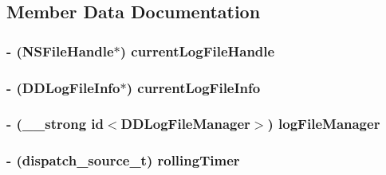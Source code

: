 \subsection{Member Data Documentation}
\hypertarget{interface_d_d_file_logger_a984d7760af0949c892412e1a0693e4d0}{
\subsubsection[{current\-Log\-File\-Handle}]{\setlength{\rightskip}{0pt plus 5cm}-\/ (N\-S\-File\-Handle$\ast$) current\-Log\-File\-Handle\hspace{0.3cm}{\ttfamily [protected]}}}\label{interface_d_d_file_logger_a984d7760af0949c892412e1a0693e4d0}
\hypertarget{interface_d_d_file_logger_a042114b326036e139f1f6ef500683696}{
\subsubsection[{current\-Log\-File\-Info}]{\setlength{\rightskip}{0pt plus 5cm}-\/ ({\bf D\-D\-Log\-File\-Info}$\ast$) current\-Log\-File\-Info\hspace{0.3cm}{\ttfamily [protected]}}}\label{interface_d_d_file_logger_a042114b326036e139f1f6ef500683696}
\hypertarget{interface_d_d_file_logger_ae69b973e11c50a89793cab1c0dcca5fd}{
\subsubsection[{log\-File\-Manager}]{\setlength{\rightskip}{0pt plus 5cm}-\/ (\-\_\-\-\_\-strong id$<${\bf D\-D\-Log\-File\-Manager}$>$) log\-File\-Manager\hspace{0.3cm}{\ttfamily [protected]}}}\label{interface_d_d_file_logger_ae69b973e11c50a89793cab1c0dcca5fd}
\hypertarget{interface_d_d_file_logger_ae42a4b7eddcb79f6ae5af833a0e2b55f}{
\subsubsection[{rolling\-Timer}]{\setlength{\rightskip}{0pt plus 5cm}-\/ (dispatch\-\_\-source\-\_\-t) rolling\-Timer\hspace{0.3cm}{\ttfamily [protected]}}}\label{interface_d_d_file_logger_ae42a4b7eddcb79f6ae5af833a0e2b55f}


